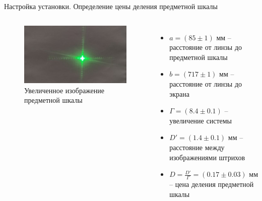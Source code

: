 \documentclass[11pt]{beamer} %
\begin{document}
    \begin{frame}{Настройка установки. Определение цены деления предметной шкалы}
    \small
        \begin{columns}
            \begin{figure}[H]
                \centering
                \includegraphics[width = \textwidth]{images/increased_cross_subject_scale.jpg}
                \caption{Увеличенное изображение предметной шкалы}
            \end{figure}
        
            \begin{itemize}
               \item $a = \left( 85 \pm 1 \right) \text{ мм}$ -- расстояние от линзы до предметной шкалы
               \item $b = \left( 717 \pm 1 \right) \text{ мм}$ -- расстояние от линзы до экрана
               \item $\Gamma = \left( 8.4 \pm 0.1 \right)$ -- увеличение системы
               \item $D' = \left( 1.4 \pm 0.1 \right) \text{ мм}$ -- расстояние между изображениями штрихов
               \item $D = \frac{D'}{\Gamma} = \left( 0.17 \pm 0.03 \right) \text{ мм}$ -- цена деления предметной шкалы
            \end{itemize}
        
        \end{columns}
    \end{frame}
\end{document}
